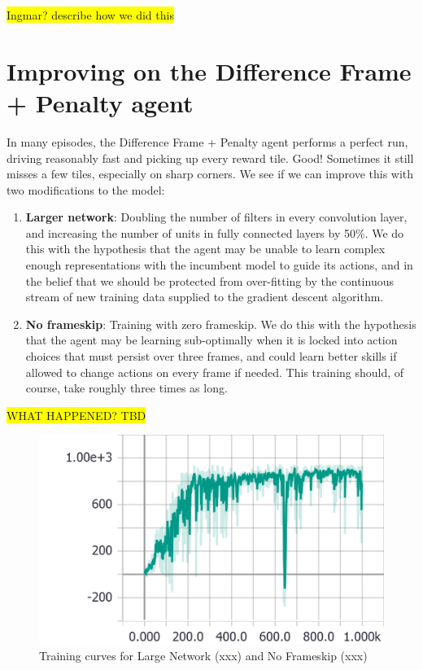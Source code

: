 \documentclass[a4paper, 11pt, conference]{ieeeconf}      %
\begin{document}
\colorbox{yellow}{Ingmar? describe how we did this}

\section{Improving on the Difference Frame + Penalty agent}

In many episodes, the Difference Frame + Penalty agent performs a perfect run, driving reasonably fast and picking up every reward tile. Good! Sometimes it still misses a few tiles, especially on sharp corners. We see if we can improve this with two modifications to the model:

\begin{enumerate}
	\item \textbf{Larger network}: Doubling the number of filters in every convolution layer, and increasing the number of units in fully connected layers by 50\%. We do this with the hypothesis that the agent may be unable to learn complex enough representations with the incumbent model to guide its actions, and in the belief that we should be protected from over-fitting by the continuous stream of new training data supplied to the gradient descent algorithm.
	
	\item \textbf{No frameskip}: Training with zero frameskip. We do this with the hypothesis that the agent may be learning sub-optimally when it is locked into action choices that must persist over three frames, and could learn better skills if allowed to change actions on every frame if needed. This training should, of course, take roughly three times as long.
	
\end{enumerate}

\colorbox{yellow}{WHAT HAPPENED? TBD}

\begin{figure}[h!]
  \includegraphics[width=\linewidth]{figs/racecar_train_4.png}
  \caption{Training curves for Large Network (xxx) and No Frameskip (xxx)}
  \label{fig:train4}
\end{figure}
\end{document}

